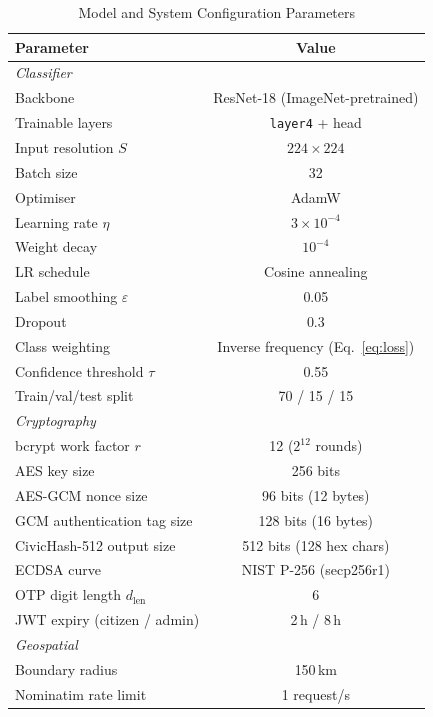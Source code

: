 \documentclass[conference]{IEEEtran}
\begin{document}
\begin{table}[t]
\caption{Model and System Configuration Parameters}
\label{tab:hyperparams}
\centering
\small
\begin{tabular}{lc}
\toprule
\textbf{Parameter} & \textbf{Value} \\
\midrule
\multicolumn{2}{l}{\emph{Classifier}} \\
Backbone & ResNet-18 (ImageNet-pretrained) \\
Trainable layers & \texttt{layer4} + head \\
Input resolution $S$ & $224 \times 224$ \\
Batch size & 32 \\
Optimiser & AdamW \\
Learning rate $\eta$ & $3 \times 10^{-4}$ \\
Weight decay & $10^{-4}$ \\
LR schedule & Cosine annealing \\
Label smoothing $\varepsilon$ & 0.05 \\
Dropout & 0.3 \\
Class weighting & Inverse frequency (Eq.~\ref{eq:loss}) \\
Confidence threshold $\tau$ & 0.55 \\
Train/val/test split & 70 / 15 / 15 \\
\midrule
\multicolumn{2}{l}{\emph{Cryptography}} \\
bcrypt work factor $r$ & 12 ($2^{12}$ rounds) \\
AES key size & 256 bits \\
AES-GCM nonce size & 96 bits (12 bytes) \\
GCM authentication tag size & 128 bits (16 bytes) \\
CivicHash-512 output size & 512 bits (128 hex chars) \\
ECDSA curve & NIST P-256 (secp256r1) \\
OTP digit length $d_{\mathrm{len}}$ & 6 \\
JWT expiry (citizen / admin) & 2\,h / 8\,h \\
\midrule
\multicolumn{2}{l}{\emph{Geospatial}} \\
Boundary radius & 150\,km \\
Nominatim rate limit & 1 request/s \\
\bottomrule
\end{tabular}
\end{table}
\end{document}
